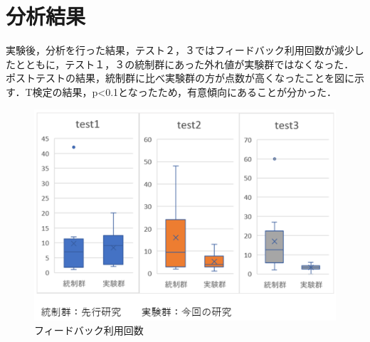 \section{分析結果}
実験後，分析を行った結果，テスト２，３ではフィードバック利用回数が減少したとともに，テスト１，３の統制群にあった外れ値が実験群ではなくなった．
ポストテストの結果，統制群に比べ実験群の方が点数が高くなったことを図に示す．T検定の結果，p<0.1となったため，有意傾向にあることが分かった．

\begin{figure}[tb]
	\includegraphics[width=0.9\linewidth]{tex1.png}
	\centering
	\caption{フィードバック利用回数}
	\label{fig1}
\end{figure}